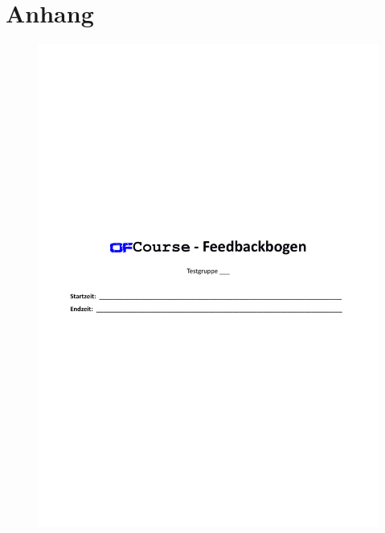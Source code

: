\appendix
\pagestyle{scrheadings}
\clearscrheadfoot
\chapter{Anhang}
\begin{figure}[h]
\centering
\includegraphics[width=0.9\linewidth, page=1]{pdf/OfCourseFeedback}
\label{fig:OfCourseFeedback}
\end{figure}
